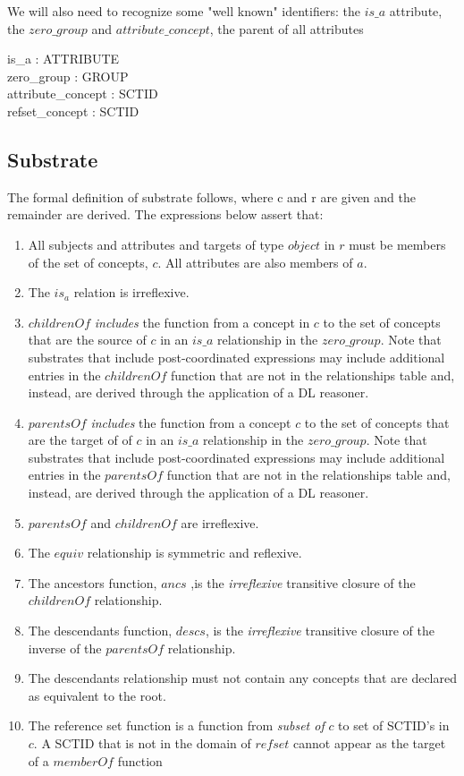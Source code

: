 \documentclass{article}
\begin{document}
We will also need to recognize some "well known" identifiers: the $is\_a$ attribute, the $zero\_group$ and  $attribute\_concept$, the parent of all attributes
\begin{axdef}
is\_a : ATTRIBUTE \\
zero\_group : GROUP \\
attribute\_concept : SCTID \\
refset\_concept : SCTID
\end{axdef}

\subsection{Substrate}
The formal definition of substrate follows, where c and r are given and the remainder are derived.  The expressions below assert that:
\begin{enumerate}
\item All subjects and attributes and targets of type $object$ in $r$  must be members of the set of concepts, $c$.  All attributes are also members of $a$.
\item The $is_a$ relation is irreflexive.
\item $childrenOf$ \emph{includes} the function from a concept in $c$ to the set of concepts that are the source of $c$ in an $is\_a$ relationship in the $zero\_group$.  Note that 
substrates that include post-coordinated expressions may include additional entries in the $childrenOf$ function that are not in the relationships table and, instead, are derived 
through the application of a DL reasoner.
\item $parentsOf$ \emph{includes} the function from a concept $c$ to the set of concepts that are the target of of $c$ in an $is\_a$ relationship in the $zero\_group$.  Note that 
substrates that include post-coordinated expressions may include additional entries in the $parentsOf$ function that are not in the relationships table and, instead, are derived 
through the application of a DL reasoner.
\item $parentsOf$ and $childrenOf$ are irreflexive.
\item The $equiv$ relationship is symmetric and reflexive.
\item The ancestors function, $ancs$ ,is the \emph{irreflexive} transitive closure of the $childrenOf$ relationship.
\item The descendants function, $descs$, is the  \emph{irreflexive} transitive closure of the inverse of the $parentsOf$ relationship. 
\item The descendants relationship must not contain any concepts that are declared as equivalent to the root.
\item The reference set function is a function from  \emph{subset of} $c$ to set of SCTID's in $c$.  A SCTID that is not in the domain of $refset$ cannot appear as the target of a $memberOf$ function
\end{enumerate}
\end{document}

